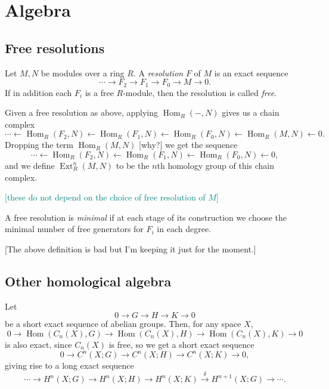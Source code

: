 \documentclass{MetricNotes2023}
\DeclareMathOperator{\Ext}{Ext}
\DeclareMathOperator{\Hom}{Hom}
\DeclareMathOperator{\im}{im}
\def\textcolour{\textcolor}
\begin{document}
\appendix 

\section{Algebra}

\subsection{Free resolutions}\label{2502220958}

\begin{definition}
Let \(M, N\) be modules over a ring \(R\). A \textit{resolution} \(F\) of \(M\) is an exact sequence 
\[\cdots \to F_2 \to F_1 \to F_0 \to M \to 0.\]
If in addition each \(F_i\) is a free \(R\)-module, then the resolution is called \textit{free}. 
\end{definition}

Given a free resolution as above, applying \(\Hom_R(-, N)\) gives us a chain complex
\[\cdots \leftarrow \Hom_R(F_2, N) \leftarrow \Hom_R(F_1, N) \leftarrow \Hom_R(F_0, N) \leftarrow \Hom_R(M, N) \leftarrow 0.\]
Dropping the term \(\Hom_R(M, N)\) [why?] we get the sequence
\[\cdots \leftarrow \Hom_R(F_2, N) \leftarrow \Hom_R(F_1, N) \leftarrow \Hom_R(F_0, N) \leftarrow 0,\]
and we define \(\Ext^n_R(M, N)\) to be the \(n\)th homology group of this chain complex. 


\textcolour{teal}{[these do not depend on the choice of free resolution of \(M\)]}

A free resolution is \textit{minimal} if at each stage of its construction we choose the minimal number of free generators for \(F_i\) in each degree.

[The above definition is bad but I'm keeping it just for the moment.]

\subsection{Other homological algebra}

Let 
\begin{equation}\label{2504071140}
0 \to G \to H \to K \to 0
\end{equation}
be a short exact sequence of abelian groups. Then, for any space \(X\), 
\[0 \to \Hom(C_n(X), G)\to \Hom(C_n(X), H) \to \Hom(C_n(X), K)\to 0\]
is also exact, since \(C_n(X)\) is free, so we get a short exact sequence
\[0 \to C^n(X;G)\to C^n(X; H) \to C^n(X; K)\to 0,\]
giving rise to a long exact sequence
\[\cdots \to H^n(X; G)\to H^n(X; H)\to H^n(X; K) \xrightarrow{\delta} H^{n+1}(X; G)\to \cdots.\]
\end{document}
